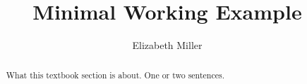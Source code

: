 \documentclass[nooutcomes]{ximera}
\author{Elizabeth Miller}
\title{Minimal Working Example}
\begin{document}
\begin{abstract}
  What this textbook section is about.  One or two sentences.
\end{abstract}
\maketitle



\end{document}
